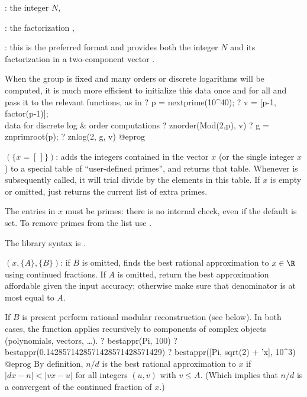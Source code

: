 \item {}: the integer $N$,

\item {}: the factorization ,

\item {}: this is the preferred format and provides both the
integer $N$ and its factorization in a two-component vector \kbd{[$N$,
fa]}.

When the group is fixed and many orders or discrete logarithms will be
computed, it is much more efficient to initialize this data once and for all
and pass it to the relevant functions, as in
\bprog
? p = nextprime(10^40);
? v = [p-1, factor(p-1)]; \\ data for discrete log & order computations
? znorder(Mod(2,p), v)
? g = znprimroot(p);
? znlog(2, g, v)
@eprog
\bigskip


$(\{x=[\,]\})$: \label{se:addprimes}adds the integers contained in the
vector $x$ (or the single integer $x$) to a special table of
``user-defined primes'', and returns that table. Whenever  is
subsequently called, it will trial divide by the elements in this table.
If $x$ is empty or omitted, just returns the current list of extra
primes.

The entries in $x$ must be primes: there is no internal check, even if
the  default is set. To remove primes from the list use
.

The library syntax is .

$(x, \{A\},\{B\})$: \label{se:bestappr}if $B$ is omitted, finds the best rational approximation to $x\in\R$
using continued fractions. If $A$ is omitted, return the best approximation
affordable given the input accuracy; otherwise make sure that denominator is
at most equal to $A$.

If $B$ is
present perform rational modular reconstruction (see below). In both cases,
the function applies recursively to components of complex objects
(polynomials, vectors, \dots).
\bprog
? bestappr(Pi, 100)
? bestappr(0.1428571428571428571428571429)
? bestappr([Pi, sqrt(2) + 'x], 10^3)
@eprog
By definition, $n/d$ is the best rational approximation to $x$ if
$|d x - n| < |v x - u|$ for all integers $(u,v)$ with $v \leq A$. (Which
implies that $n/d$ is a convergent of the continued fraction of $x$.)


